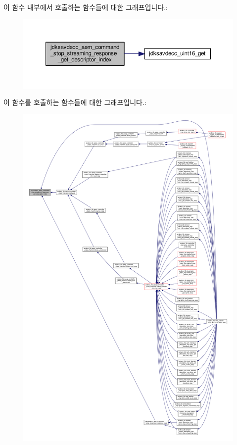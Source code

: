 이 함수 내부에서 호출하는 함수들에 대한 그래프입니다.\+:
\nopagebreak
\begin{figure}[H]
\begin{center}
\leavevmode
\includegraphics[width=350pt]{group__command__stop__streaming__response_gae809969de67ed8d5343a27f6aeac63a8_cgraph}
\end{center}
\end{figure}




이 함수를 호출하는 함수들에 대한 그래프입니다.\+:
\nopagebreak
\begin{figure}[H]
\begin{center}
\leavevmode
\includegraphics[width=350pt]{group__command__stop__streaming__response_gae809969de67ed8d5343a27f6aeac63a8_icgraph}
\end{center}
\end{figure}


